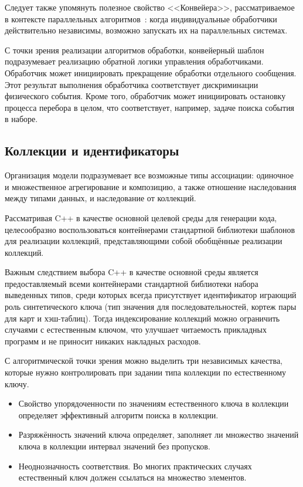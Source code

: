 Следует также упомянуть полезное свойство <<Конвейера>>, рассматриваемое
в контексте параллельных
алгоритмов~\cite{Mattson2005-parallel-patterns, smirnov-besm6}:
когда индивидуальные обработчики действительно независимы, возможно
запускать их на параллельных системах.

С точки зрения реализации алгоритмов обработки, конвейерный шаблон
подразумевает реализацию обратной логики управления обработчиками.
Обработчик может инициировать прекращение обработки отдельного сообщения.
Этот результат выполнения обработчика соответствует
дискриминации физического события. Кроме того, обработчик может
инициировать остановку процесса перебора в целом, что соответствует,
например, задаче поиска события в наборе.

\subsection{Коллекции и идентификаторы}

Организация модели подразумевает все возможные типы
ассоциации: одиночное и множественное агрегирование и композицию, а
также отношение наследования между типами данных, и наследование от
коллекций. 

Рассматривая C++ в качестве основной целевой среды для генерации кода,
целесообразно воспользоваться контейнерами стандартной библиотеки
шаблонов для реализации коллекций, представляющими собой обобщённые
реализации коллекций.

Важным следствием выбора C++ в качестве основной среды является
предоставляемый всеми контейнерами стандартной библиотеки набора
выведенных типов, среди которых всегда присутствует идентификатор
играющий роль синтетического ключа (тип значения для последовательностей,
кортеж пары для карт и хэш-таблиц). Тогда индексирование коллекций
можно ограничить случаями с естественным ключом, что улучшает
читаемость прикладных программ и не приносит никаких накладных
расходов.

С алгоритмической точки зрения можно выделить три независимых качества,
которые нужно контролировать при задании типа коллекции по
естественному ключу.
\begin{itemize}
    \item Свойство упорядоченности по значениям естественного ключа
    в коллекции определяет эффективный алгоритм поиска в коллекции.
    \item Разряжённость значений ключа определяет, заполняет ли
    множество значений ключа в коллекции интервал значений без пропусков.
    \item Неоднозначность соответствия.  Во многих практических случаях
    естественный ключ должен ссылаться на множество элементов.
\end{itemize}

